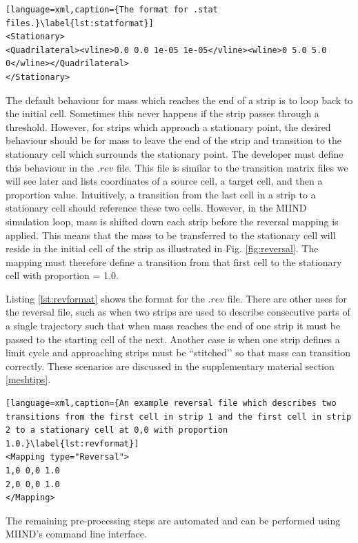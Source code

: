 \documentclass[utf8]{frontiersSCNS} %
\begin{document}
\begin{lstlisting}[language=xml,caption={The format for .stat files.}\label{lst:statformat}]
<Stationary>
<Quadrilateral><vline>0.0 0.0 1e-05 1e-05</vline><wline>0 5.0 5.0 0</wline></Quadrilateral>
</Stationary>
\end{lstlisting}

The default behaviour for mass which reaches the end of a strip is to loop back to the initial cell. Sometimes this never happens if the strip passes through a threshold. However, for strips which approach a stationary point, the desired behaviour should be for mass to leave the end of the strip and transition to the stationary cell which surrounds the stationary point. The developer must define this behaviour in the $.rev$ file. This file is similar to the transition matrix files we will see later and lists coordinates of a source cell, a target cell, and then a proportion value. Intuitively, a transition from the last cell in a strip to a stationary cell should reference these two cells. However, in the MIIND simulation loop, mass is shifted down each strip before the reversal mapping is applied. This means that the mass to be transferred to the stationary cell will reside in the initial cell of the strip as illustrated in Fig. \ref{fig:reversal}. The mapping must therefore define a transition from that first cell to the stationary cell with proportion = 1.0.

Listing \ref{lst:revformat} shows the format for the $.rev$ file. There are other uses for the reversal file, such as when two strips are used to describe consecutive parts of a single trajectory such that when mass reaches the end of one strip it must be passed to the starting cell of the next. Another case is when one strip defines a limit cycle and approaching strips must be ``stitched’’ so that mass can transition correctly. These scenarios are discussed in the supplementary material section \ref{meshtips}.

\begin{lstlisting}[language=xml,caption={An example reversal file which describes two transitions from the first cell in strip 1 and the first cell in strip 2 to a stationary cell at 0,0 with proportion 1.0.}\label{lst:revformat}]
<Mapping type="Reversal">
1,0	0,0	1.0
2,0	0,0	1.0
</Mapping>
\end{lstlisting}

The remaining pre-processing steps are automated and can be performed using MIIND’s command line interface.
\end{document}
